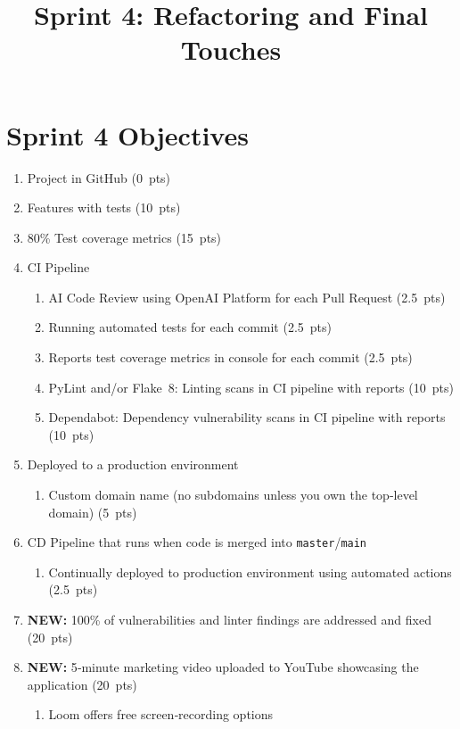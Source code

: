 \documentclass{article}
\title{Sprint 4: Refactoring and Final Touches}
\author{}
\date{}
\begin{document}
\maketitle
\section*{Sprint 4 Objectives}

\begin{enumerate}[label=\arabic*)]
\item Project in GitHub (0~pts)
\item Features with tests (10~pts)
\item 80\% Test coverage metrics (15~pts)
\item CI Pipeline
    \begin{enumerate}
        \item AI Code Review using OpenAI Platform for each Pull Request (2.5~pts)
        \item Running automated tests for each commit (2.5~pts)
        \item Reports test coverage metrics in console for each commit (2.5~pts)
        \item PyLint and/or Flake~8: Linting scans in CI pipeline with reports (10~pts)
        \item Dependabot: Dependency vulnerability scans in CI pipeline with reports (10~pts)
    \end{enumerate}
\item Deployed to a production environment
    \begin{enumerate}
        \item Custom domain name (no subdomains unless you own the top‑level domain) (5~pts)
    \end{enumerate}
\item CD Pipeline that runs when code is merged into \texttt{master}/\texttt{main}
    \begin{enumerate}
        \item Continually deployed to production environment using automated actions (2.5~pts)
    \end{enumerate}
\item \textbf{NEW:} 100\% of vulnerabilities and linter findings are addressed and fixed (20~pts)
\item \textbf{NEW:} 5‑minute marketing video uploaded to YouTube showcasing the application (20~pts)
    \begin{enumerate}
        \item Loom offers free screen‑recording options
    \end{enumerate}
\end{enumerate}
\end{document}
